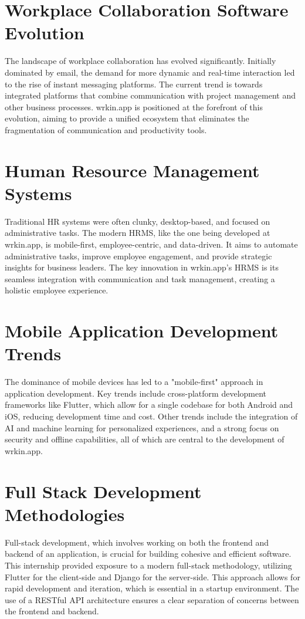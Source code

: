 \section{Workplace Collaboration Software Evolution}
The landscape of workplace collaboration has evolved significantly. Initially dominated by email, the demand for more dynamic and real-time interaction led to the rise of instant messaging platforms. The current trend is towards integrated platforms that combine communication with project management and other business processes. wrkin.app is positioned at the forefront of this evolution, aiming to provide a unified ecosystem that eliminates the fragmentation of communication and productivity tools.

\section{Human Resource Management Systems}
Traditional HR systems were often clunky, desktop-based, and focused on administrative tasks. The modern HRMS, like the one being developed at wrkin.app, is mobile-first, employee-centric, and data-driven. It aims to automate administrative tasks, improve employee engagement, and provide strategic insights for business leaders. The key innovation in wrkin.app's HRMS is its seamless integration with communication and task management, creating a holistic employee experience.

\section{Mobile Application Development Trends}
The dominance of mobile devices has led to a "mobile-first" approach in application development. Key trends include cross-platform development frameworks like Flutter, which allow for a single codebase for both Android and iOS, reducing development time and cost. Other trends include the integration of AI and machine learning for personalized experiences, and a strong focus on security and offline capabilities, all of which are central to the development of wrkin.app.

\section{Full Stack Development Methodologies}
Full-stack development, which involves working on both the frontend and backend of an application, is crucial for building cohesive and efficient software. This internship provided exposure to a modern full-stack methodology, utilizing Flutter for the client-side and Django for the server-side. This approach allows for rapid development and iteration, which is essential in a startup environment. The use of a RESTful API architecture ensures a clear separation of concerns between the frontend and backend.

